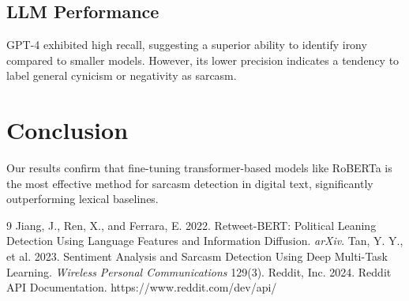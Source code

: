 \documentclass[sigconf]{acmart}
\begin{document}
\subsection{LLM Performance}
GPT-4 exhibited high recall, suggesting a superior ability to identify irony compared to smaller models. However, its lower precision indicates a tendency to label general cynicism or negativity as sarcasm.

\section{Conclusion}
Our results confirm that fine-tuning transformer-based models like RoBERTa is the most effective method for sarcasm detection in digital text, significantly outperforming lexical baselines.

\begin{thebibliography}{9}
 Jiang, J., Ren, X., and Ferrara, E. 2022. Retweet-BERT: Political Leaning Detection Using Language Features and Information Diffusion. \textit{arXiv}.
 Tan, Y. Y., et al. 2023. Sentiment Analysis and Sarcasm Detection Using Deep Multi-Task Learning. \textit{Wireless Personal Communications} 129(3).
 Reddit, Inc. 2024. Reddit API Documentation. https://www.reddit.com/dev/api/
\end{thebibliography}
\end{document}
